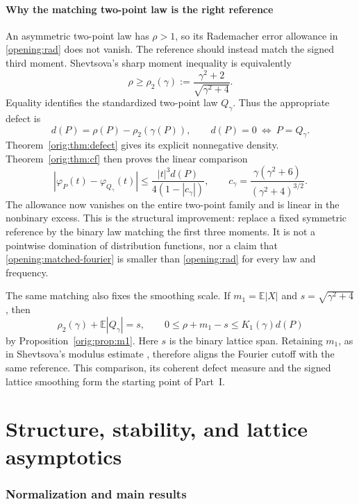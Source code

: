 \documentclass[11pt,a4paper]{article}
\numberwithin{equation}{section}
\theoremstyle{definition}
\theoremstyle{remark}
\newcommand{\E}{\mathbb E}
\begin{document}
\subsection{Why the matching two-point law is the right reference}
An asymmetric two-point law has \(\rho>1\), so its Rademacher error
allowance in \eqref{opening:rad} does not vanish. The reference
should instead match the signed third moment.
Shevtsova's sharp moment inequality \cite[Theorem~6]{Shevtsova2014}
is equivalently
\begin{equation}\label{opening:sharp-moment}
 \rho\ge\rho_2(\gamma):=
 \frac{\gamma^2+2}{\sqrt{\gamma^2+4}}.
\end{equation}
Equality identifies the standardized two-point law \(Q_\gamma\).
Thus the appropriate defect is
\[
 d(P)=\rho(P)-\rho_2(\gamma(P)),\qquad
 d(P)=0\ \Longleftrightarrow\ P=Q_\gamma.
\]
Theorem~\ref{orig:thm:defect} gives its explicit nonnegative density.
Theorem~\ref{orig:thm:cf} then proves the linear comparison
\begin{equation}\label{opening:matched-fourier}
 |\varphi_P(t)-\varphi_{Q_\gamma}(t)|
 \le\frac{|t|^3d(P)}{4(1-|c_\gamma|)},\qquad
 c_\gamma=\frac{\gamma(\gamma^2+6)}{(\gamma^2+4)^{3/2}}.
\end{equation}
The allowance now vanishes on the entire two-point family and is
linear in the nonbinary excess. This is the structural improvement:
replace a fixed symmetric reference by the binary law matching the
first three moments. It is not a pointwise domination of distribution
functions, nor a claim that \eqref{opening:matched-fourier} is smaller
than \eqref{opening:rad} for every law and frequency.

The same matching also fixes the smoothing scale. If
\(m_1=\E|X|\) and \(s=\sqrt{\gamma^2+4}\), then
\[
 \rho_2(\gamma)+\E|Q_\gamma|=s,
 \qquad 0\le\rho+m_1-s\le K_1(\gamma)d(P)
\]
by Proposition~\ref{orig:prop:m1}. Here \(s\) is the binary lattice
span. Retaining \(m_1\), as in Shevtsova's modulus estimate
\cite{Shevtsova2012}, therefore aligns the Fourier cutoff with the
same reference. This comparison, its coherent defect measure and
the signed lattice smoothing form the starting point of Part~I.

\clearpage
\part{Structure, stability, and lattice asymptotics}\label{part:structural}
\section{Normalization and main results}
\end{document}
